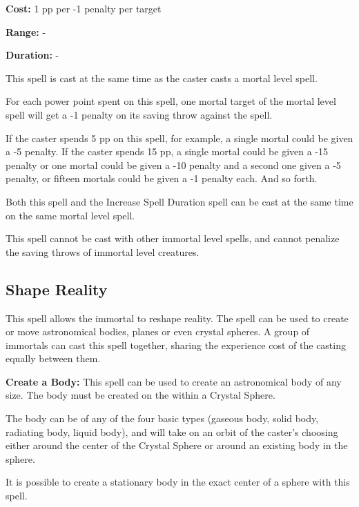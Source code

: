 \begin{multicols*}{2}
{\textbf{Cost:} 1 pp per -1 penalty per target

\textbf{Range:} -

\textbf{Duration:} -}

This spell is cast at the same time as the caster casts a mortal level spell.

For each power point spent on this spell, one mortal target of the mortal level spell will get a -1 penalty on its saving throw against the spell.

If the caster spends 5 pp on this spell, for example, a single mortal could be given a -5 penalty. If the caster spends 15 pp, a single mortal could be given a -15 penalty or one mortal could be given a -10 penalty and a second one given a -5 penalty, or fifteen mortals could be given a -1 penalty each. And so forth.

Both this spell and the Increase Spell Duration spell can be cast at the same time on the same mortal level spell.

This spell cannot be cast with other immortal level spells, and cannot penalize the saving throws of immortal level creatures.

\subsection{Shape Reality}

This spell allows the immortal to reshape reality. The spell can be used to create or move astronomical bodies, planes or even crystal spheres. A group of immortals can cast this spell together, sharing the experience cost of the casting equally between them.

\textbf{Create a Body:} This spell can be used to create an astronomical body of any size. The body must be created on the  within a Crystal Sphere.

The body can be of any of the four basic types (gaseous body, solid body, radiating body, liquid body), and will take on an orbit of the caster’s choosing either around the center of the Crystal Sphere or around an existing body in the sphere.

It is possible to create a stationary body in the exact center of a sphere with this spell.


\end{multicols*}
